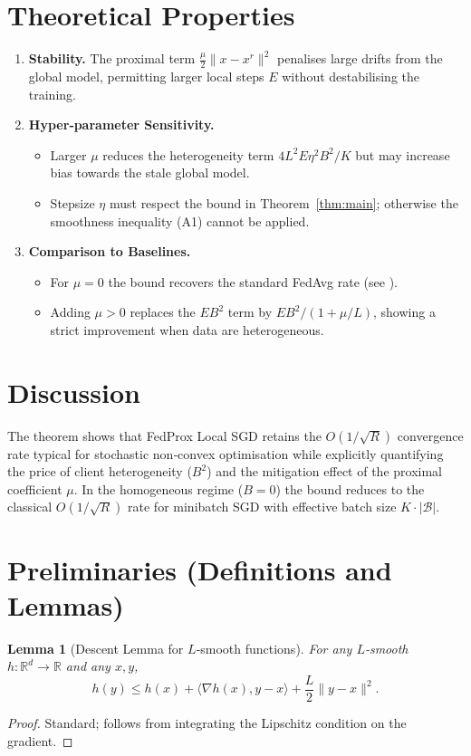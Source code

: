\documentclass{article}
\newtheorem{lemma}{Lemma}
\newcommand{\R}{\mathbb{R}}
\begin{document}
\section*{Theoretical Properties}
\begin{enumerate}[leftmargin=*]
    \item \textbf{Stability.} The proximal term $\frac{\mu}{2}\|x-x^{r}\|^{2}$ penalises large drifts from the global model, permitting larger local steps $E$ without destabilising the training.
    \item \textbf{Hyper‑parameter Sensitivity.}
    \begin{itemize}
        \item Larger $\mu$ reduces the heterogeneity term $4L^{2}E\eta^{2}B^{2}/K$ but may increase bias towards the stale global model.
        \item Stepsize $\eta$ must respect the bound in Theorem~\ref{thm:main}; otherwise the smoothness inequality (A1) cannot be applied.
    \end{itemize}
    \item \textbf{Comparison to Baselines.}
    \begin{itemize}
        \item For $\mu=0$ the bound recovers the standard FedAvg rate (see \cite{McMahan2017}).
        \item Adding $\mu>0$ replaces the $EB^{2}$ term by $E B^{2}/(1+\mu/L)$, showing a strict improvement when data are heterogeneous.
    \end{itemize}
\end{enumerate}

\section*{Discussion}
The theorem shows that FedProx Local SGD retains the $O(1/\sqrt{R})$ convergence rate typical for stochastic non‑convex optimisation while explicitly quantifying the price of client heterogeneity ($B^{2}$) and the mitigation effect of the proximal coefficient $\mu$. In the homogeneous regime ($B=0$) the bound reduces to the classical $O(1/\sqrt{R})$ rate for minibatch SGD with effective batch size $K\cdot |\mathcal{B}|$.

\newpage
\section*{Preliminaries (Definitions and Lemmas)}
\begin{lemma}[Descent Lemma for $L$‑smooth functions]\label{lem:descent}
For any $L$‑smooth $h:\R^{d}\!\to\!\R$ and any $x,y$,
\[
    h(y)\le h(x)+\langle\nabla h(x),y-x\rangle+\frac{L}{2}\|y-x\|^{2}.
\]
\end{lemma}
\begin{proof}
Standard; follows from integrating the Lipschitz condition on the gradient. \qedhere
\end{proof}
\end{document}
